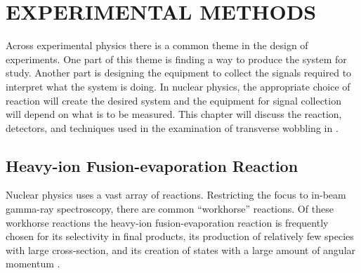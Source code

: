 %
%

\chapter{EXPERIMENTAL METHODS}
\label{chp:exp-pr}
Across experimental physics there is a common theme in the design of experiments. One part of this theme is finding a way to produce the system for study. Another part is designing the equipment to collect the signals required to interpret what the system is doing. In nuclear physics, the appropriate choice of reaction will create the desired system and the equipment for signal collection will depend on what is to be measured. This chapter will discuss the reaction, detectors, and techniques used in the examination of transverse wobbling in \pr{}.
\section{Heavy-ion Fusion-evaporation Reaction}
\label{sec:exp-pr-fus-evap}
Nuclear physics uses a vast array of reactions. Restricting the focus to in-beam gamma-ray spectroscopy, there are common ``workhorse'' reactions. Of these workhorse reactions the heavy-ion fusion-evaporation reaction is frequently chosen for its selectivity in final products, its production of relatively few species with large cross-section, and its creation of states with a large amount of angular momentum \cite{beausang1996arrays}.
